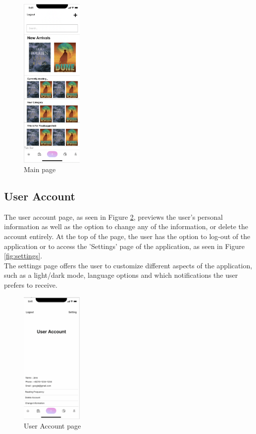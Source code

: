 \documentclass[conference]{IEEEtran}
\begin{document}
\begin{figure}[h]
    \centering
    \includegraphics[width=3cm]{Resources/Specifications/mainpage.png}
    \caption{Main page}
    \label{fig:mainpage}
\end{figure}

\subsection{User Account}
The user account page, as seen in Figure \ref{fig:useracc}, previews the user's personal information as well as the option to change any of the information, or delete the account entirely. At the top of the page, the user has the option to log-out of the application or to access the 'Settings' page of the application, as seen in Figure \ref{fig:settings}. \\

The settings page offers the user to customize different aspects of the application, such as a light/dark mode, language options and which notifications the user prefers to receive.


\begin{figure}[h]
    \centering
    \includegraphics[width=3cm]{Resources/Specifications/useracc.png}
    \caption{User Account page}
    \label{fig:useracc}
\end{figure}
\end{document}
